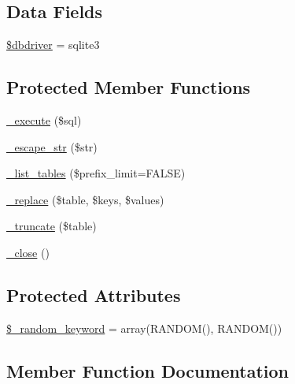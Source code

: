 \subsection*{Data Fields}
\begin{DoxyCompactItemize}
\item 
\hyperlink{class_c_i___d_b__sqlite3__driver_a0cde2a16322a023d040aa7f725877597}{\$dbdriver} = \textquotesingle{}sqlite3\textquotesingle{}
\end{DoxyCompactItemize}
\subsection*{Protected Member Functions}
\begin{DoxyCompactItemize}
\item 
\hyperlink{class_c_i___d_b__sqlite3__driver_a114ab675d89bf8324a41785fb475e86d}{\+\_\+execute} (\$sql)
\item 
\hyperlink{class_c_i___d_b__sqlite3__driver_af8ef0237bfcdb19215b63fff769e7a55}{\+\_\+escape\+\_\+str} (\$str)
\item 
\hyperlink{class_c_i___d_b__sqlite3__driver_a435c0f3ce54fe7daa178baa8532ebd54}{\+\_\+list\+\_\+tables} (\$prefix\+\_\+limit=F\+A\+L\+S\+E)
\item 
\hyperlink{class_c_i___d_b__sqlite3__driver_ae0adf73984daf2d42ad29b66c484c82b}{\+\_\+replace} (\$table, \$keys, \$values)
\item 
\hyperlink{class_c_i___d_b__sqlite3__driver_aa029600528fc1ce660a23ff4b4667f95}{\+\_\+truncate} (\$table)
\item 
\hyperlink{class_c_i___d_b__sqlite3__driver_a4d9082658000e5ede8312067c6dda9db}{\+\_\+close} ()
\end{DoxyCompactItemize}
\subsection*{Protected Attributes}
\begin{DoxyCompactItemize}
\item 
\hyperlink{class_c_i___d_b__sqlite3__driver_a10213aa6e05f6d924d3277bb1d2fea00}{\$\+\_\+random\+\_\+keyword} = array(\textquotesingle{}R\+A\+N\+D\+O\+M()\textquotesingle{}, \textquotesingle{}R\+A\+N\+D\+O\+M()\textquotesingle{})
\end{DoxyCompactItemize}


\subsection{Member Function Documentation}
\hypertarget{class_c_i___d_b__sqlite3__driver_a4d9082658000e5ede8312067c6dda9db}{}
